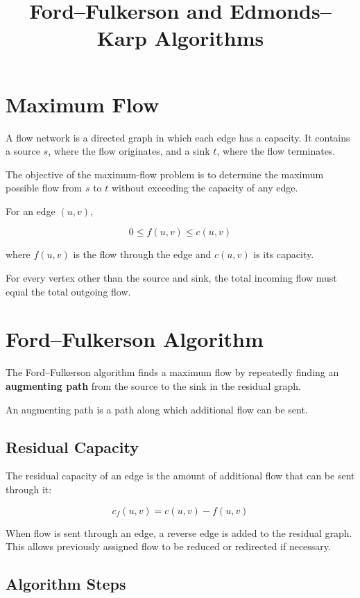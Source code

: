 \documentclass[12pt,a4paper]{article}
\title{\textbf{Ford--Fulkerson and Edmonds--Karp Algorithms}}
\author{}
\date{}
\begin{document}
\maketitle

\section{Maximum Flow}

A flow network is a directed graph in which each edge has a capacity.
It contains a source $s$, where the flow originates, and a sink $t$,
where the flow terminates.

The objective of the maximum-flow problem is to determine the maximum
possible flow from $s$ to $t$ without exceeding the capacity of any edge.

For an edge $(u,v)$,

\[
0 \leq f(u,v) \leq c(u,v)
\]

where $f(u,v)$ is the flow through the edge and $c(u,v)$ is its capacity.

For every vertex other than the source and sink, the total incoming flow
must equal the total outgoing flow.

\section{Ford--Fulkerson Algorithm}

The Ford--Fulkerson algorithm finds a maximum flow by repeatedly finding
an \textbf{augmenting path} from the source to the sink in the residual
graph.

An augmenting path is a path along which additional flow can be sent.

\subsection{Residual Capacity}

The residual capacity of an edge is the amount of additional flow that
can be sent through it:

\[
c_f(u,v) = c(u,v) - f(u,v)
\]

When flow is sent through an edge, a reverse edge is added to the
residual graph. This allows previously assigned flow to be reduced or
redirected if necessary.

\subsection{Algorithm Steps}
\end{document}
